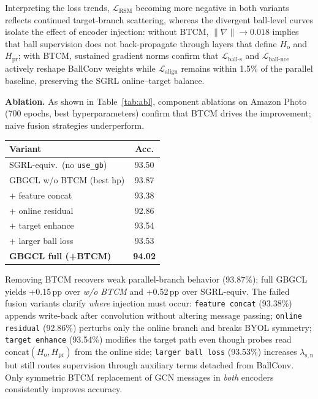\documentclass[conference]{IEEEtran}
\begin{document}
Interpreting the loss trends, $\mathcal{L}_{\mathrm{RSM}}$ becoming more negative in both variants reflects continued target-branch scattering, whereas the divergent ball-level curves isolate the effect of encoder injection: without BTCM, $\|\nabla\|\!\to\!0.018$ implies that ball supervision does not back-propagate through layers that define $H_{\mathrm{o}}$ and $H_{\mathrm{pr}}$; with BTCM, sustained gradient norms confirm that $\mathcal{L}_{\mathrm{ball\mbox{-}s}}$ and $\mathcal{L}_{\mathrm{ball\mbox{-}nce}}$ actively reshape BallConv weights while $\mathcal{L}_{\mathrm{align}}$ remains within 1.5\% of the parallel baseline, preserving the SGRL online--target balance.

\textbf{Ablation.}
As shown in Table~\ref{tab:abl}, component ablations on Amazon Photo (700 epochs, best hyperparameters) confirm that BTCM drives the improvement; naive fusion strategies underperform.
\begin{center}
  \scriptsize
  \label{tab:abl}
  \begin{tabular}{lc}
    \toprule
    Variant & Acc. \\
    \midrule
    SGRL-equiv.\ (no \texttt{use\_gb}) & 93.50 \\
    GBGCL w/o BTCM (best hp) & 93.87 \\
    \quad + feature concat & 93.38 \\
    \quad + online residual & 92.86 \\
    \quad + target enhance & 93.54 \\
    \quad + larger ball loss & 93.53 \\
    \textbf{GBGCL full (+BTCM)} & \textbf{94.02} \\
    \bottomrule
  \end{tabular}
\end{center}
Removing BTCM recovers weak parallel-branch behavior (93.87\%); full GBGCL yields +0.15\,pp over \emph{w/o BTCM} and +0.52\,pp over SGRL-equiv.
The failed fusion variants clarify \emph{where} injection must occur: \texttt{feature concat} (93.38\%) appends write-back after convolution without altering message passing; \texttt{online residual} (92.86\%) perturbs only the online branch and breaks BYOL symmetry; \texttt{target enhance} (93.54\%) modifies the target path even though probes read $\mathrm{concat}(H_{\mathrm{o}},H_{\mathrm{pr}})$ from the online side; \texttt{larger ball loss} (93.53\%) increases $\lambda_{\mathrm{s,n}}$ but still routes supervision through auxiliary terms detached from BallConv.
Only symmetric BTCM replacement of GCN messages in \emph{both} encoders consistently improves accuracy.
\end{document}
